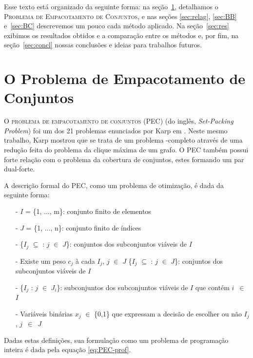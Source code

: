 \documentclass{article}
\begin{document}
	Esse texto está organizado da seguinte forma: na seção~\ref{sec:prob}, detalhamos o \textsc{Problema de Empacotamento de Conjuntos}, e nas seções \ref{sec:relag}, \ref{sec:BB} e~\ref{sec:BC} descrevemos um pouco cada método aplicado. Na seção~\ref{sec:res} exibimos os resultados obtidos e a comparação entre os métodos e, por fim, na seção~\ref{sec:concl} nossas conclusões e ideias para trabalhos futuros.
	
	\section{O Problema de Empacotamento de Conjuntos}\label{sec:prob}
	O \textsc{problema de empacotamento de conjuntos} (PEC) (do inglês, \emph{Set-Packing Problem}) foi um dos 21 problemas enunciados por Karp em \cite{Karp}. Neste mesmo trabalho, Karp mostrou que se trata de um problema \NP-completo através de uma redução feita do problema da clique máxima de um grafo. O PEC também possui forte relação com o problema da cobertura de conjuntos, estes formando um par dual-forte.
	
	A descrição formal do PEC, como um problema de otimização, é dada da seguinte forma:

	\begin{itemize}
	    \item[-] $I$ = \{1, ..., m\}: conjunto finito de elementos
	    
	    \item[-] $J$ = \{1, ..., n\}: conjunto finito de índices
	    
	    \item[-] \{$I_j$ $\subseteq$ : $j$ $\in$ $J$\}: conjuntos dos subconjuntos viáveis de $I$
	    
	    \item[-] Existe um peso $c_j$ à cada $I_j$, $j$ $\in$ $J$
	    \{$I_j$ $\subseteq$ : $j$ $\in$ $J$\}: conjuntos dos subconjuntos viáveis de $I$
	    
	    \item[-] \{$I_j$ : $j$ $\in$ $J_i$\}: subconjuntos dos subconjuntos viáveis de $I$ que contém $i$~$\in$~$I$
	    \item[-] Variáveis binárias $x_j$ $\in$ \{0,1\} que expressam a decisão de escolher ou não $I_j$, $j$~$\in$~$J$
	\end{itemize}
	
	
	Dadas estas definições, sua formulação como um problema de programação inteira é dada pela equação \ref{eq:PEC-prof}.
	
\end{document}
